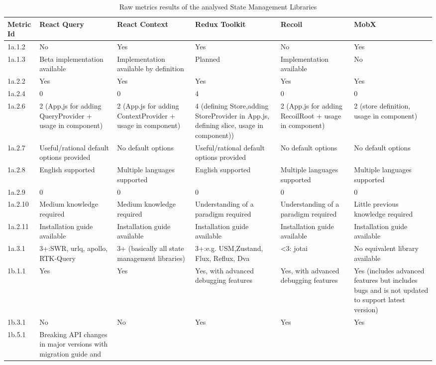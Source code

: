 \begin{longtable}[]{|p{1.5cm}p{2.25cm}p{2.25cm}p{2.25cm}p{2.25cm}p{2cm}|}
    \caption{Raw metrics results of the analysed State Management Libraries}
    \label{table:results_metrics_raw}\\
    \toprule
Metric Id & React Query & React Context & Redux
Toolkit & Recoil & MobX \\
\midrule
\endhead
1a.1.2 & No & Yes & Yes & No & Yes \\
1a.1.3 & Beta implementation available & Implementation available by
definition & Planned & Implementation available & No \\
1a.2.2 & Yes & Yes & Yes & Yes & Yes \\
1a.2.4 & 0 & 0 & 4 & 0 & 0 \\
1a.2.6 & 2 (App.js for adding QueryProvider + usage in component) & 2
(App.js for adding ContextProvider + usage in component) & 4 (defining
Store,adding StoreProvider in App.js, defining slice, usage in
component)) & 2 (App.js for adding RecoilRoot + usage in component) & 2
(store definition, usage in component) \\
1a.2.7 & Useful/rational default options provided & No default options &
Useful/rational default options provided & No default options & No
default options \\
1a.2.8 & English supported & Multiple languages supported & English
supported & Multiple languages supported & Multiple languages
supported \\
1a.2.9 & 0 & 0 & 0 & 0 & 0 \\
1a.2.10 & Medium knowledge required & Medium knowledge required &
Understanding of a paradigm required & Understanding of a paradigm
required & Little previous knowledge required \\
1a.2.11 & Installation guide available & Installation guide available &
Installation guide available & Installation guide available &
Installation guide available \\
1a.3.1 & 3+:SWR, urlq, apollo, RTK-Query & 3+ (basically all state
management libraries) & 3+:e.g. USM,Zustand, Flux, Reflux, Dva &
\textless3: jotai & No equivalent library available \\
1b.1.1 & Yes & Yes & Yes, with advanced debugging features & Yes, with
advanced debugging features & Yes (includes advanced features but
includes bugs and is not updated to support latest version) \\
1b.3.1 & No & No & Yes & Yes & Yes \\
1b.5.1 & Breaking API changes in major versions with migration guide and

\end{longtable}
